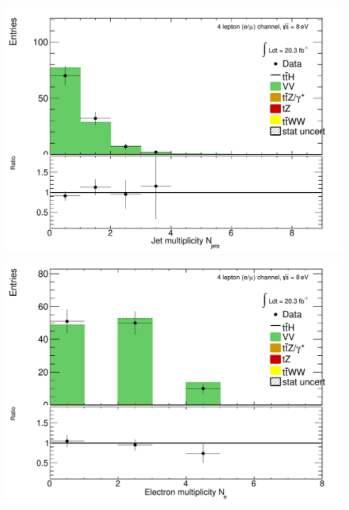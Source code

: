 \begin{figure}[htbp]
  \begin{minipage}[h]{0.5\textwidth}
    \centering \includegraphics[width=\textwidth]{figs/WZ/plotCand_4lep_ZZ_CR_Njet}
  \end{minipage}\hfill
  \begin{minipage}[h]{0.5\textwidth}
    \centering \includegraphics[width=\textwidth]{figs/WZ/plotCand_4lep_ZZ_CR_NElec}
  \end{minipage}\hfill
  \begin{minipage}[h]{0.5\textwidth}

\end{minipage}
\end{figure}
